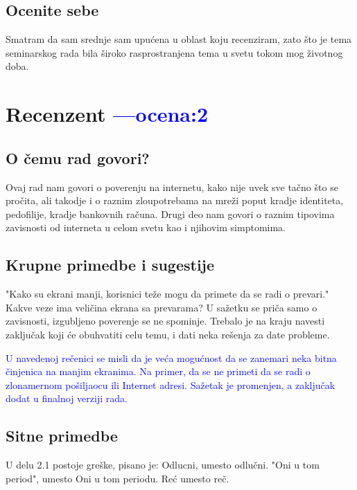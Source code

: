 \documentclass[a4paper]{report}
\newcommand{\odgovor}[1]{\textcolor{blue}{#1}}
\begin{document}
\section{Ocenite sebe}
Smatram da sam srednje sam upućena u oblast koju recenziram, zato što je tema seminarskog rada bila široko rasprostranjena tema u svetu tokom mog životnog doba.

\chapter{Recenzent \odgovor{---ocena:2} }


\section{O čemu rad govori?}


Ovaj rad nam govori o poverenju na internetu, kako nije uvek sve tačno što se pročita, ali takodje i o raznim zloupotrebama na mreži poput kradje identiteta, pedofilije, kradje bankovnih računa. Drugi deo nam govori o raznim tipovima zavisnosti od interneta u celom svetu kao i njihovim simptomima.

\section{Krupne primedbe i sugestije}
"Kako su ekrani manji, korisnici teže mogu da primete da se radi o prevari." Kakve veze ima veličina ekrana sa prevarama?
U sažetku se priča samo o zavisnosti, izgubljeno poverenje se ne spominje. Trebalo je na kraju navesti zaključak koji će obuhvatiti celu temu, i dati neka rešenja za date probleme. 

\odgovor{U navedenoj rečenici se misli da je veća mogućnost da se zanemari neka bitna činjenica na manjim ekranima. Na primer, da se ne primeti da se radi o zlonamernom pošiljaocu ili Internet adresi. Sažetak je promenjen, a zaključak dodat u finalnoj verziji rada.}
\section{Sitne primedbe}
U delu 2.1 postoje greške, pisano je:
Odlucni, umesto odlučni.
"Oni u tom period", umesto Oni u tom periodu.
Reć umesto reč.
\end{document}
